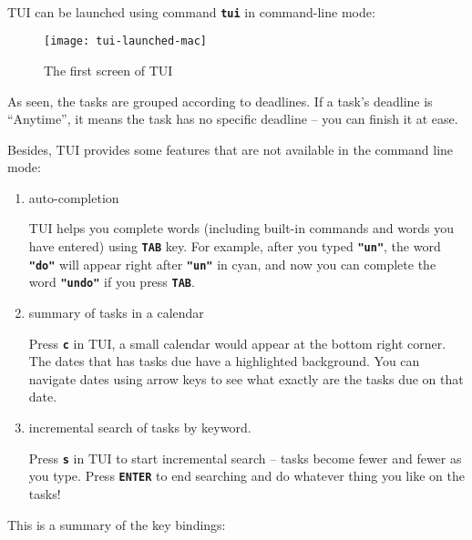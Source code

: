 \documentclass[12pt, a4paper]{article}
\newcommand{\cmdinline}[1]{{\bf \texttt{#1}}}
\begin{document}
\\TUI can be launched using command \cmdinline{tui} in command-line mode:

\begin{figure}[htbp]
  \centering
  \texttt{[image: tui-launched-mac]}
  \caption{The first screen of TUI}
\end{figure}

As seen, the tasks are grouped according to deadlines. If a task's deadline is ``Anytime'', it means the task has no specific deadline -- you can finish it at ease.

Besides, TUI provides some features that are not available in the command line mode:\begin{enumerate}
\item auto-completion

  TUI helps you complete words (including built-in commands and words you have entered) using \cmdinline{TAB} key. For example, after you typed \cmdinline{"un"}, the word \cmdinline{"do"} will appear right after \cmdinline{"un"} in cyan, and now you can complete the word \cmdinline{"undo"} if you press \cmdinline{TAB}.
\item summary of tasks in a calendar

  Press \cmdinline{c} in TUI, a small calendar would appear at the bottom right corner. The dates that has tasks due have a highlighted background. You can navigate dates using arrow keys to see what exactly are the tasks due on that date.
\item incremental search of tasks by keyword.

  Press \cmdinline{s} in TUI to start incremental search -- tasks become fewer and fewer as you type. Press \cmdinline{ENTER} to end searching and do whatever thing you like on the tasks!
\end{enumerate}

This is a summary of the key bindings:\\
\end{document}
